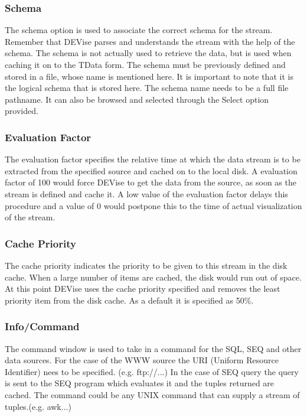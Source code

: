 \subsubsection{Schema}

The schema option is used to associate the correct schema for the stream. Remember that DEVise parses and understands the stream with the help of the schema. The schema is not actually used to retrieve the data, but is used when caching it on to the TData form. The schema must be previously defined and stored in a file, whose name is mentioned here. It is important to note that it is the logical schema that is stored here. The schema name needs to be a full file pathname. It can also be browsed and selected through the Select option provided.

\subsubsection{Evaluation Factor}

The evaluation factor specifies the relative time at which the data stream is to be extracted from the specified source and cached on to the local disk. A evaluation factor of 100 would force DEVise to get the data from the source, as soon as the stream is  defined and cache it. A low value of the evaluation factor delays this procedure and a value of 0 would postpone this to the time of actual visualization of the stream.

\subsubsection{Cache Priority}

The cache priority indicates the priority to be given to this stream in the disk cache. When a large number of items are cached, the disk would run out of space. At this point DEVise uses the cache priority specified and removes the least priority item from the disk cache. As a default it is specified as 50\%.

\subsubsection{Info/Command}

The command window is used to take in a command for the SQL, SEQ and other data sources. For the case of the WWW source the URI (Uniform Resource Identifier) nees to be specified. (e.g. ftp://...) In the case of SEQ query the query is sent to the SEQ program which evaluates it and the tuples returned are cached. The command could be any UNIX command that can supply a stream of tuples.(e.g. awk...) 

